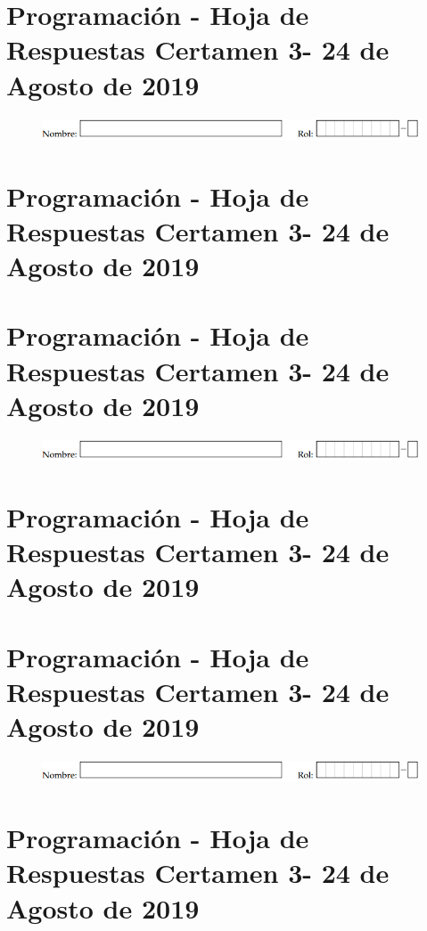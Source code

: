 \documentclass[spanish]{scrartcl}
\newcommand{\numCert}{3}
\newcommand{\annoCert}{2019}
\newcommand{\fechaCert}{24 de Agosto de \annoCert}
\begin{document}
\section*{Programación - Hoja de Respuestas Certamen \numCert - \fechaCert}
\vspace*{-.6cm}
\begin{figure}[h]
    \centering
    \includegraphics[scale=0.9]{Imagenes/nombrerol.png}
\end{figure}
\vspace*{-1.0cm}

\newpage

\section*{Programación - Hoja de Respuestas Certamen \numCert - \fechaCert}

\newpage

\section*{Programación - Hoja de Respuestas Certamen \numCert - \fechaCert}
\vspace*{-.6cm}
\begin{figure}[h]
    \centering
    \includegraphics[scale=0.9]{Imagenes/nombrerol.png}
\end{figure}
\vspace*{-1.0cm}

\newpage

\section*{Programación - Hoja de Respuestas Certamen \numCert - \fechaCert}

\newpage

\section*{Programación - Hoja de Respuestas Certamen \numCert - \fechaCert}
\vspace*{-.6cm}
\begin{figure}[h]
    \centering
    \includegraphics[scale=0.9]{Imagenes/nombrerol.png}
\end{figure}
\vspace*{-1.0cm}

\newpage

\section*{Programación - Hoja de Respuestas Certamen \numCert - \fechaCert}
\end{document}
